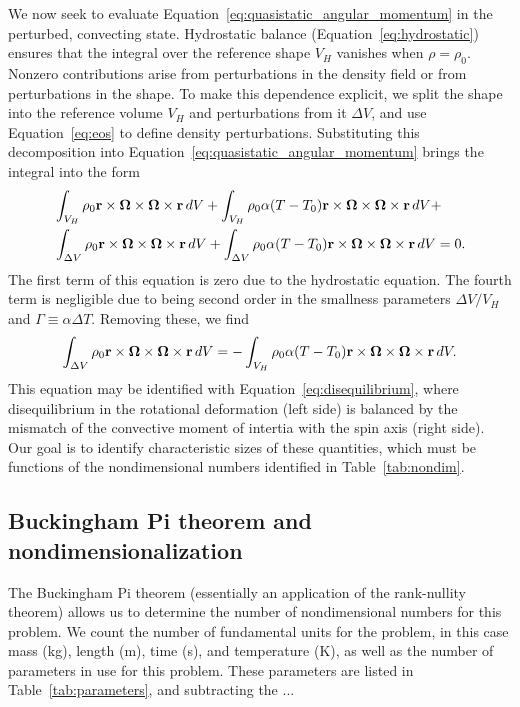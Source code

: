\documentclass[extra,mreferee]{gji}
\newif\ifdetail
\begin{document}
We now seek to evaluate Equation~\eqref{eq:quasistatic_angular_momentum} in the perturbed, convecting state.
Hydrostatic balance (Equation~\eqref{eq:hydrostatic}) ensures that the integral over the reference shape $V_H$ vanishes when $\rho = \rho_0$.
Nonzero contributions arise from perturbations in the density field or from perturbations in the shape.
To make this dependence explicit, we split the shape into the reference volume $V_H$ and perturbations from it $\Delta V$,
and use Equation~\eqref{eq:eos} to define density perturbations.
Substituting this decomposition into Equation~\eqref{eq:quasistatic_angular_momentum} brings the integral into the form
\begin{equation}
\begin{aligned}
&\int_{V_H} \rho_0 \mathbf{r} \times \mitbf{\Omega} \times \mitbf{\Omega} \times \mathbf{r} \,dV + 
\int_{V_H} \rho_0 \alpha (T-T_0) \mathbf{r} \times \mitbf{\Omega} \times \mitbf{\Omega} \times \mathbf{r} \,dV +  \\
&\int_{\Delta V} \rho_0 \mathbf{r} \times \mitbf{\Omega} \times \mitbf{\Omega} \times \mathbf{r} \,dV + 
\int_{\Delta V} \rho_0 \alpha (T-T_0) \mathbf{r} \times \mitbf{\Omega} \times \mitbf{\Omega} \times \mathbf{r} \,dV = 0.  \\
\end{aligned}
\end{equation}
The first term of this equation is zero due to the hydrostatic equation.  
The fourth term is negligible due to being second order in the smallness parameters $\Delta V/V_H$ and $\Gamma\equiv \alpha \Delta T$.
Removing these, we find
\begin{equation}
\begin{aligned}
\int_{\Delta V} \rho_0 \mathbf{r} \times \mitbf{\Omega} \times \mitbf{\Omega} \times \mathbf{r} \,dV = 
-\int_{V_H} \rho_0 \alpha (T-T_0) \mathbf{r} \times \mitbf{\Omega} \times \mitbf{\Omega} \times \mathbf{r} \,dV.
\end{aligned}
\end{equation}
This equation may be identified with Equation~\eqref{eq:disequilibrium}, where disequilibrium in the rotational deformation (left side) is balanced by the mismatch of the convective moment of intertia with the spin axis (right side).
Our goal is to identify characteristic sizes of these quantities, which must be functions of the nondimensional numbers identified in Table~\ref{tab:nondim}.

\ifdetail
\subsection{Buckingham Pi theorem and nondimensionalization}
\label{sec:buckingham}
The Buckingham Pi theorem (essentially an application of the rank-nullity theorem) allows us to determine the number of nondimensional numbers for this problem.
We count the number of fundamental units for the problem, in this case mass (kg), length (m), time (s), and temperature (K), as well as the number of parameters in use for this problem.  
These parameters are listed in Table~\ref{tab:parameters}, and subtracting the ...
\end{document}
